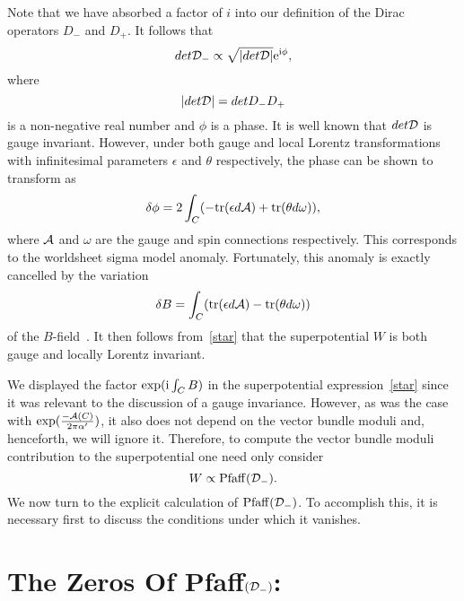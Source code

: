 \documentclass[a4paper,12pt]{article}
\numberwithin{equation}{section}
\theoremstyle{plain}
\begin{document}
%
Note that we have absorbed a factor of $i$ into our definition of the
Dirac
operators $D_{-}$ and $D_{+}$.
It follows that
%
\begin{equation}
det {\cal D}_{-} \propto \sqrt{ |det {\cal D}|} {\rm e}^{{\rm i} \phi},
\label{11}
\end{equation}
%
where
%
\begin{equation}
|det{\cal D}| = detD_{-}D_{+}
\label{twostars}
\end{equation}
%
is a non-negative real number and $\phi$ is a phase. It is well known that
$det{\cal D}$ is gauge invariant. However, under both gauge and local
Lorentz transformations with infinitesimal parameters $\epsilon$ and
$\theta$ respectively, the phase can be shown to transform as
\begin{equation}
\delta \phi = 2 \int_C (-{\rm tr} (\epsilon d{\cal{A}}) + {\rm tr}
(\theta d\omega )),
\label{12}
\end{equation}
%
where ${\cal{A}}$ and $\omega$ are the gauge and spin connections
respectively.
This corresponds to the worldsheet sigma model anomaly. Fortunately, this
anomaly
is exactly cancelled by the variation
%
\begin{equation}
\delta B = \int_C ({\rm tr} (\epsilon d{\cal{A}}) -{\rm tr}
(\theta d\omega))
\label{13}
\end{equation}
of the $B$-field~\cite{Witten2}. It then follows from~\eqref{star}
that the
superpotential $W$ is both gauge and locally Lorentz invariant.

We displayed the factor ${\rm exp}({\rm i} \int_{C} B)$ in the
superpotential expression~\eqref{star} since it was relevant to the
discussion
of a gauge invariance. However, as was the case with
${\rm exp} (\frac{- {\cal A}(C)}{2\pi \alpha^{\prime}})$,
it also does not depend on the vector bundle moduli and, henceforth, we
will
ignore it. Therefore, to compute the vector bundle moduli contribution to
the superpotential one need only consider
%
\begin{equation}
W \propto {\rm Pfaff}({\cal D}_{-}).
\label{14}
\end{equation}
%
We now turn to the explicit calculation of ${\rm Pfaff}({\cal D}_{-})$. To
accomplish this, it is necessary first to discuss the conditions under
which it vanishes.


\section{The Zeros Of Pfaff$({\cal D}_{-})$:}
\end{document}
